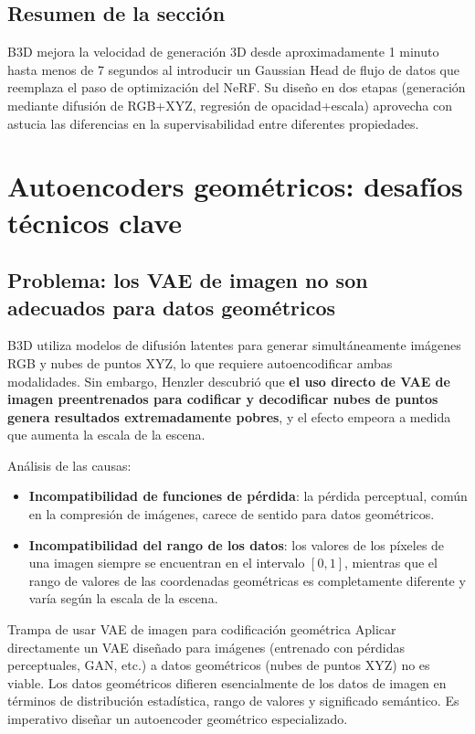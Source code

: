 \documentclass[a4paper]{article}
\begin{document}
\subsection{Resumen de la sección}

B3D mejora la velocidad de generación 3D desde aproximadamente 1 minuto hasta menos de 7 segundos al introducir un Gaussian Head de flujo de datos que reemplaza el paso de optimización del NeRF. Su diseño en dos etapas (generación mediante difusión de RGB+XYZ, regresión de opacidad+escala) aprovecha con astucia las diferencias en la supervisabilidad entre diferentes propiedades.
\section{Autoencoders geométricos: desafíos técnicos clave}

\subsection{Problema: los VAE de imagen no son adecuados para datos geométricos}

B3D utiliza modelos de difusión latentes para generar simultáneamente imágenes RGB y nubes de puntos XYZ, lo que requiere autoencodificar ambas modalidades. Sin embargo, Henzler descubrió que \textbf{el uso directo de VAE de imagen preentrenados para codificar y decodificar nubes de puntos genera resultados extremadamente pobres}, y el efecto empeora a medida que aumenta la escala de la escena.

Análisis de las causas:
\begin{itemize}
    \item \textbf{Incompatibilidad de funciones de pérdida}: la pérdida perceptual, común en la compresión de imágenes, carece de sentido para datos geométricos.
    \item \textbf{Incompatibilidad del rango de los datos}: los valores de los píxeles de una imagen siempre se encuentran en el intervalo $[0, 1]$, mientras que el rango de valores de las coordenadas geométricas es completamente diferente y varía según la escala de la escena.
\end{itemize}

\begin{warningbox}{Trampa de usar VAE de imagen para codificación geométrica}
Aplicar directamente un VAE diseñado para imágenes (entrenado con pérdidas perceptuales, GAN, etc.) a datos geométricos (nubes de puntos XYZ) no es viable. Los datos geométricos difieren esencialmente de los datos de imagen en términos de distribución estadística, rango de valores y significado semántico. Es imperativo diseñar un autoencoder geométrico especializado.
\end{warningbox}
\end{document}
